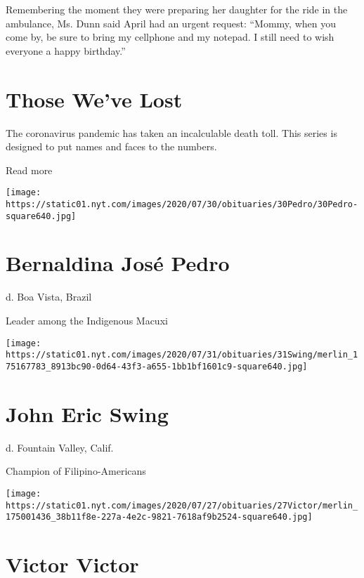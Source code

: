Remembering the moment they were preparing her daughter for the ride in
the ambulance, Ms. Dunn said April had an urgent request: ``Mommy, when
you come by, be sure to bring my cellphone and my notepad. I still need
to wish everyone a happy birthday.''

\href{https://www.nytimes.com/interactive/2020/obituaries/people-died-coronavirus-obituaries.html?action=click\&pgtype=Article\&state=default\&region=BELOW_MAIN_CONTENT\&context=covid_obits_promo}{}

\hypertarget{those-weve-lost}{%
\section{Those We've Lost}\label{those-weve-lost}}

The coronavirus pandemic has taken an incalculable death toll. This
series is designed to put names and faces to the numbers.

Read more

\texttt{[image: https://static01.nyt.com/images/2020/07/30/obituaries/30Pedro/30Pedro-square640.jpg]}

\hypertarget{bernaldina-josuxe9-pedro}{%
\section{Bernaldina José Pedro}\label{bernaldina-josuxe9-pedro}}

d. Boa Vista, Brazil

Leader among the Indigenous Macuxi

\texttt{[image: https://static01.nyt.com/images/2020/07/31/obituaries/31Swing/merlin\_175167783\_8913bc90-0d64-43f3-a655-1bb1bf1601c9-square640.jpg]}

\hypertarget{john-eric-swing}{%
\section{John Eric Swing}\label{john-eric-swing}}

d. Fountain Valley, Calif.

Champion of Filipino-Americans

\texttt{[image: https://static01.nyt.com/images/2020/07/27/obituaries/27Victor/merlin\_175001436\_38b11f8e-227a-4e2c-9821-7618af9b2524-square640.jpg]}

\hypertarget{victor-victor}{%
\section{Victor Victor}\label{victor-victor}}

